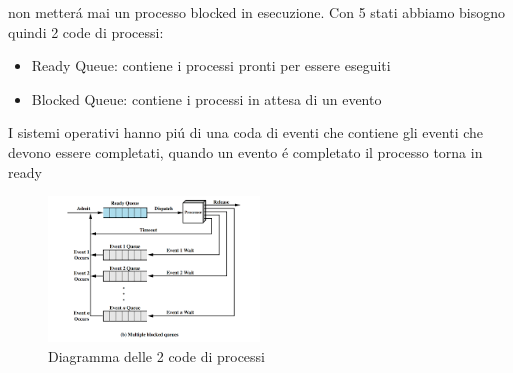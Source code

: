 \documentclass[11pt]{article}
\begin{document}
non metterá mai un processo blocked in esecuzione.
Con 5 stati abbiamo bisogno quindi 2 code di processi:
\begin{itemize}
    \item Ready Queue: contiene i processi pronti per essere eseguiti
    \item Blocked Queue: contiene i processi in attesa di un evento
\end{itemize}
I sistemi operativi hanno piú di una coda di eventi che contiene gli eventi che devono essere completati, quando un evento é completato
il processo torna in ready
\begin{figure}
    \centering
    \includegraphics[width=0.5\textwidth]{immagini/5StatiCode2}
    \caption{Diagramma delle 2 code di processi}
\end{figure}
\end{document}
